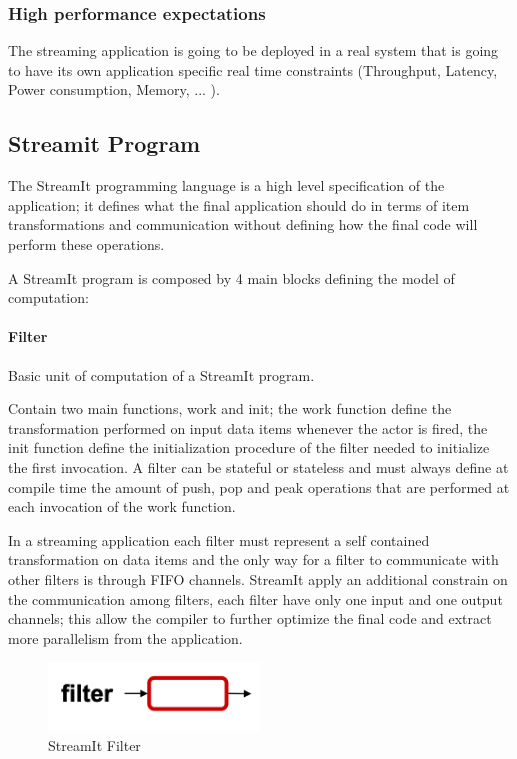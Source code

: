 \documentclass[../main.tex]{subfiles}
\begin{document}
\subsubsection{High performance expectations}
The streaming application is going to be deployed in a real system that is going to have its own application specific real time constraints (Throughput, Latency, Power consumption, Memory, ... ). 

\subsection{Streamit Program}

The StreamIt programming language is a high level specification of the application; it defines what the final application should do in terms of item transformations and communication without defining how the final code will perform these operations.

A StreamIt program is composed by 4 main blocks defining the model of computation:

\paragraph{Filter}
Basic unit of computation of a StreamIt program.

Contain two main functions, work and init; the work function define the transformation performed on input data items whenever the actor is fired, the init function define the initialization procedure of the filter needed to initialize the first invocation. A filter can be stateful or stateless and must always define at compile time the amount of push, pop and peak operations that are performed at each invocation of the work function.

\newpage
In a streaming application each filter must represent a self contained transformation on data items and the only way for a filter to communicate with other filters is through FIFO channels. StreamIt apply an additional constrain on the communication among filters, each filter have only one input and one output channels; this allow the compiler to further optimize the final code and extract more parallelism from the application.


\begin{figure}[h!]
  \includegraphics[width=0.5\textwidth]{images/StreamItFilter.png}
  \centering
  \caption{StreamIt Filter}
  \label{fig:filter}
\end{figure}
\end{document}
